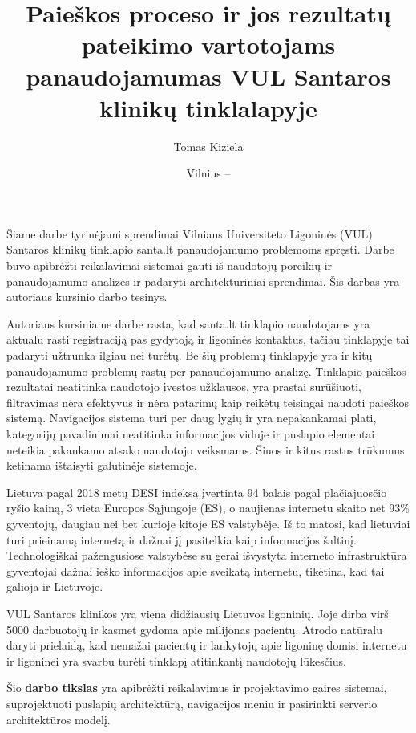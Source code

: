 \documentclass{VUMIFPSkursinis}
\title{Paieškos proceso ir jos rezultatų pateikimo vartotojams panaudojamumas VUL Santaros klinikų tinklalapyje}
\author{Tomas Kiziela}
\date{Vilnius – \the\year}
\begin{document}
	
\maketitle
\cleardoublepage{}
\setcounter{page}{2}

\tableofcontents



Šiame darbe tyrinėjami sprendimai Vilniaus Universiteto Ligoninės (VUL) Santaros klinikų tinklapio santa.lt panaudojamumo problemoms spręsti. Darbe buvo apibrėžti reikalavimai sistemai gauti iš naudotojų poreikių ir panaudojamumo analizės ir padaryti architektūriniai sprendimai. Šis darbas yra autoriaus kursinio darbo tesinys\cite{Kursinis}.

Autoriaus kursiniame darbe rasta, kad santa.lt tinklapio naudotojams yra aktualu rasti registraciją pas gydytoją ir ligoninės kontaktus, tačiau tinklapyje tai padaryti užtrunka ilgiau nei turėtų. Be šių problemų tinklapyje yra ir kitų panaudojamumo problemų rastų per panaudojamumo analizę. Tinklapio paieškos rezultatai neatitinka naudotojo įvestos užklausos, yra prastai surūšiuoti, filtravimas nėra efektyvus ir nėra patarimų kaip reikėtų teisingai naudoti paieškos sistemą. Navigacijos sistema turi per daug lygių ir yra nepakankamai plati, kategorijų pavadinimai neatitinka informacijos viduje ir puslapio elementai neteikia pakankamo atsako naudotojo veiksmams. Šiuos ir kitus rastus trūkumus ketinama ištaisyti galutinėje sistemoje.

Lietuva pagal 2018 metų DESI indeksą įvertinta 94 balais pagal plačiajuosčio ryšio kainą, 3 vieta Europos Sąjungoje (ES), o naujienas internetu skaito net 93\% gyventojų, daugiau nei bet kurioje kitoje ES valstybėje\cite{InternetasLt}. Iš to matosi, kad lietuviai turi prieinamą internetą ir dažnai jį pasitelkia kaip informacijos šaltinį. Technologiškai pažengusiose valstybėse su gerai išvystyta interneto infrastruktūra gyventojai dažnai ieško informacijos apie sveikatą internetu\cite{InternetUseByPublicSAEn}\cite{InternetUseByPublicHKEn}, tikėtina, kad tai galioja ir Lietuvoje.

VUL Santaros klinikos yra viena didžiausių Lietuvos ligoninių. Joje dirba virš 5000 darbuotojų ir kasmet gydoma apie milijonas pacientų\cite{VulSkApieMusLt}. Atrodo natūralu daryti prielaidą, kad nemažai pacientų ir lankytojų apie ligoninę domisi internetu ir ligoninei yra svarbu turėti tinklapį atitinkantį naudotojų lūkesčius.

Šio \textbf{darbo tikslas} yra apibrėžti reikalavimus ir projektavimo gaires sistemai, suprojektuoti puslapių architektūrą, navigacijos meniu ir pasirinkti serverio architektūros modelį. 
\end{document}
